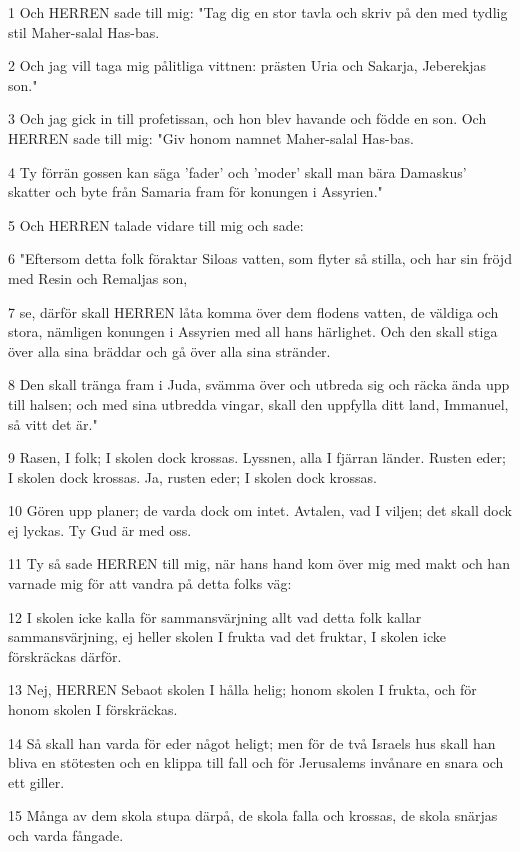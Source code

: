 \par 1 Och HERREN sade till mig: "Tag dig en stor tavla och skriv på den med tydlig stil Maher-salal Has-bas.
\par 2 Och jag vill taga mig pålitliga vittnen: prästen Uria och Sakarja, Jeberekjas son."
\par 3 Och jag gick in till profetissan, och hon blev havande och födde en son. Och HERREN sade till mig: "Giv honom namnet Maher-salal Has-bas.
\par 4 Ty förrän gossen kan säga 'fader' och 'moder' skall man bära Damaskus' skatter och byte från Samaria fram för konungen i Assyrien."
\par 5 Och HERREN talade vidare till mig och sade:
\par 6 "Eftersom detta folk föraktar Siloas vatten, som flyter så stilla, och har sin fröjd med Resin och Remaljas son,
\par 7 se, därför skall HERREN låta komma över dem flodens vatten, de väldiga och stora, nämligen konungen i Assyrien med all hans härlighet. Och den skall stiga över alla sina bräddar och gå över alla sina stränder.
\par 8 Den skall tränga fram i Juda, svämma över och utbreda sig och räcka ända upp till halsen; och med sina utbredda vingar, skall den uppfylla ditt land, Immanuel, så vitt det är."
\par 9 Rasen, I folk; I skolen dock krossas. Lyssnen, alla I fjärran länder. Rusten eder; I skolen dock krossas. Ja, rusten eder; I skolen dock krossas.
\par 10 Gören upp planer; de varda dock om intet. Avtalen, vad I viljen; det skall dock ej lyckas. Ty Gud är med oss.
\par 11 Ty så sade HERREN till mig, när hans hand kom över mig med makt och han varnade mig för att vandra på detta folks väg:
\par 12 I skolen icke kalla för sammansvärjning allt vad detta folk kallar sammansvärjning, ej heller skolen I frukta vad det fruktar, I skolen icke förskräckas därför.
\par 13 Nej, HERREN Sebaot skolen I hålla helig; honom skolen I frukta, och för honom skolen I förskräckas.
\par 14 Så skall han varda för eder något heligt; men för de två Israels hus skall han bliva en stötesten och en klippa till fall och för Jerusalems invånare en snara och ett giller.
\par 15 Många av dem skola stupa därpå, de skola falla och krossas, de skola snärjas och varda fångade.
